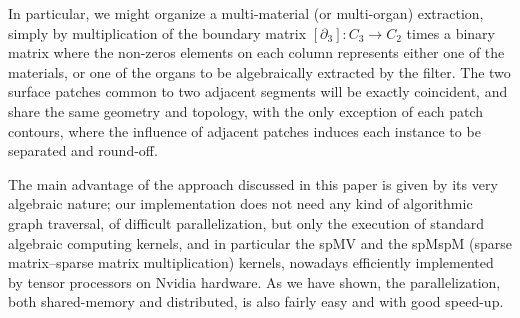 \documentclass{article}
\begin{document}
In particular, we might organize a multi-material (or multi-organ) extraction, simply by multiplication of the boundary matrix $[\partial_3]: C_3\to C_2$  times a binary matrix where the non-zeros elements on each column represents either one of the materials, or one of the organs to be algebraically extracted by the filter. The two surface patches common to two adjacent segments will be exactly coincident, and share the same geometry and topology, with the only exception of each patch contours, where the influence of adjacent patches induces each instance to be separated and round-off.
%

The main advantage of the approach discussed in this paper is given by its very algebraic nature; our implementation does not need any kind of algorithmic graph traversal, of difficult parallelization, but only the execution of standard algebraic computing kernels, and in particular the spMV and the spMspM (sparse matrix--sparse matrix multiplication) kernels, nowadays efficiently implemented by tensor processors on Nvidia hardware.  As we have shown, the parallelization, both shared-memory and distributed, is also fairly easy and with good speed-up.
\end{document}
